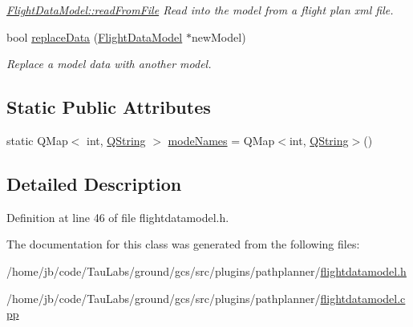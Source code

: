 \begin{DoxyCompactItemize}
\begin{DoxyCompactList}\small\item\em \hyperlink{group___path_ga39997b5fd9d9720f2798e2c1a18b8171}{\-Flight\-Data\-Model\-::read\-From\-File} \-Read into the model from a flight plan xml file. \end{DoxyCompactList}\item 
bool \hyperlink{group___path_ga59cab53123301865b4604e97e13e1ce0}{replace\-Data} (\hyperlink{class_flight_data_model}{\-Flight\-Data\-Model} $\ast$new\-Model)
\begin{DoxyCompactList}\small\item\em \-Replace a model data with another model. \end{DoxyCompactList}\end{DoxyCompactItemize}
\subsection*{\-Static \-Public \-Attributes}
\begin{DoxyCompactItemize}
\item 
static \-Q\-Map$<$ int, \hyperlink{group___u_a_v_objects_plugin_gab9d252f49c333c94a72f97ce3105a32d}{\-Q\-String} $>$ \hyperlink{group___path_gae4137f8c1c8d4c53cea911761c13b182}{mode\-Names} = \-Q\-Map$<$int, \hyperlink{group___u_a_v_objects_plugin_gab9d252f49c333c94a72f97ce3105a32d}{\-Q\-String}$>$()
\end{DoxyCompactItemize}


\subsection{\-Detailed \-Description}


\-Definition at line 46 of file flightdatamodel.\-h.



\-The documentation for this class was generated from the following files\-:\begin{DoxyCompactItemize}
\item 
/home/jb/code/\-Tau\-Labs/ground/gcs/src/plugins/pathplanner/\hyperlink{flightdatamodel_8h}{flightdatamodel.\-h}\item 
/home/jb/code/\-Tau\-Labs/ground/gcs/src/plugins/pathplanner/\hyperlink{flightdatamodel_8cpp}{flightdatamodel.\-cpp}\end{DoxyCompactItemize}
